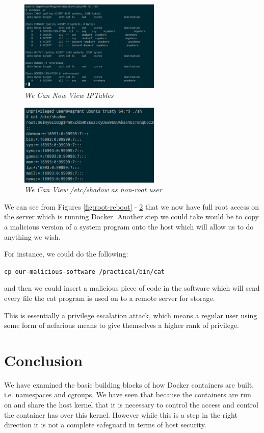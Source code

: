 \documentclass{article}
\begin{document}
\begin{figure}[!h]
\centering
\includegraphics*[width=0.6\textwidth]{components/images/root-iptables}
\caption{\em We Can Now View IPTables}
\label{fig:root-iptables}
\end{figure}

\begin{figure}[!h]
\centering
\includegraphics*[width=0.6\textwidth]{components/images/root-shadow}
\caption{\em We Can View /etc/shadow as non-root user}
\label{fig:root-shadow}
\end{figure}

We can see from Figures \ref{fig:root-reboot} - \ref{fig:root-shadow} that we now have full root access on the server which is running Docker. Another step we could take would be to copy a malicious version of a system program onto the host which will allow us to do anything we wish. 

For instance, we could do the following:

\texttt{cp our-malicious-software /practical/bin/cat}

and then we could insert a malicious piece of code in the software which will send every file the cat program is used on to a remote server for storage.

This is essentially a privilege escalation attack, which means a regular user using some form of nefarious means to give themselves a higher rank of privilege.

\newpage
\section{Conclusion}
\label{sec:Conclusion}
We have examined the basic building blocks of how Docker containers are built, i.e. namespaces and cgroups. We have seen that because the containers are run on and share the host kernel that it is necessary to control the access and control the container has over this kernel. However while this is a step in the right direction it is not a complete safeguard in terms of host security. 
\end{document}
